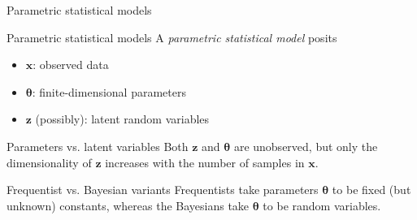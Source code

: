 \documentclass[10pt]{beamer}
\newcommand{\+}[1]{\ensuremath{{\boldsymbol #1}}} %
\begin{document}



\begin{frame}{Parametric statistical models}

\begin{block}{Parametric statistical models}
A \textit{parametric statistical model} posits 
\begin{itemize}
\item $\+x$: observed data 
\item $\+\theta$: finite-dimensional parameters 
\item  $\+z$ (possibly): latent random variables 
\end{itemize}
\end{block}

\vfill 
{}
\begin{block}{Parameters vs. latent variables}
Both $\+z$ and $\+\theta$ are unobserved, but only the dimensionality of $\+z$ increases with the number of samples in $\+x$.   
\end{block}


\vfill 
{}
\begin{block}{Frequentist vs. Bayesian variants}
Frequentists take parameters $\+\theta$  to be fixed (but unknown) constants, whereas the Bayesians take $\+\theta$ to be random variables. %
\end{block} 

\end{frame}
\end{document}
